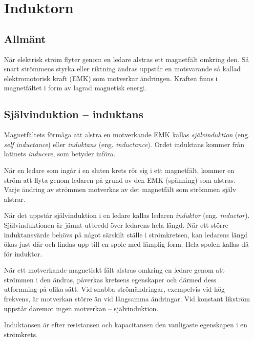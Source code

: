 \newpage %
\section{Induktorn}

\subsection{Allmänt}
\label{induktor_allmänt}

När elektrisk ström flyter genom en ledare alstras ett magnetfält omkring
den. Så snart strömmens styrka eller riktning ändras uppstår en motsvarande
så kallad elektromotorisk kraft (EMK) som motverkar ändringen. Kraften finns i
magnetfältet i form av lagrad magnetisk energi.


\subsection{Självinduktion -- induktans}

Magnetfältets förmåga att alstra en motverkande EMK kallas
\emph{självinduktion} (eng. \emph{self inductance}) eller
\emph{induktans} (eng. \emph{inductance}).
Ordet induktans kommer från latinets \emph{inducere}, som betyder införa.

När en ledare som ingår i en sluten krets rör sig i ett magnetfält, kommer
en ström att flyta genom ledaren på grund av den EMK (spänning) som alstras.
Varje ändring av strömmen motverkas av det magnetfält som strömmen själv
alstrar.

När det uppstår självinduktion i en ledare kallas ledaren \emph{induktor}
(eng. \emph{inductor}).
Självinduktionen är jämnt utbredd över ledarens hela längd. När ett större
induktansvärde behövs på något särskilt ställe i strömkretsen, kan ledarens
längd ökas just där och lindas upp till en spole med lämplig form.
Hela spolen kallas då för induktor.

När ett motverkande magnetiskt fält alstras omkring en ledare genom att strömmen 
i den ändras, påverkas kretsens egenskaper och därmed dess utformning på olika sätt.
Vid snabba strömändringar, exempelvis vid hög frekvens, är motverkan större än vid
långsamma ändringar.
Vid konstant likström uppstår däremot ingen motverkan -- självinduktion.

Induktansen är efter resistansen och kapacitansen den vanligaste egenskapen i
en strömkrets.

